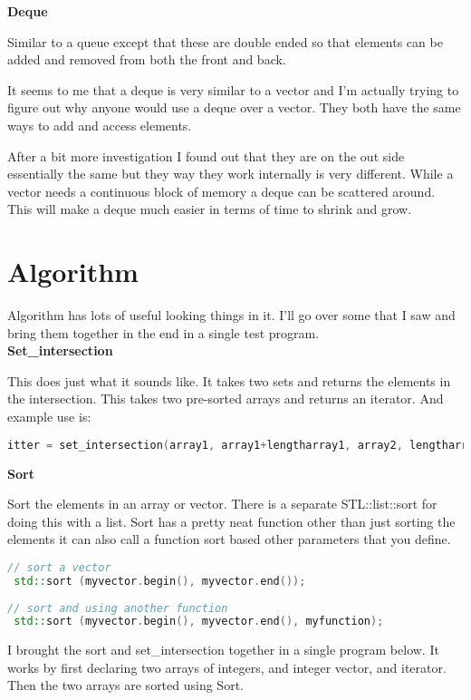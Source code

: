 \documentclass[a4paper,12pt]{article}
\begin{document}
\textbf{Deque}

Similar to a queue except that these are double ended so that elements can be added and removed from both the front and back. 

It seems to me that a deque is very similar to a vector and I'm actually trying to figure out why anyone would use a deque over a vector. They both have the same ways to add and access elements.  

After a bit more investigation I found out that they are on the out side essentially the same but they way they work internally is very different.  While a vector needs a continuous block of memory a deque can be scattered around.  This will make a deque much easier in terms of time to shrink and grow.  

\section{Algorithm}

Algorithm has lots of useful looking things in it.  I'll go over some that I saw and bring them together in the end in a single test program. \\

\textbf{Set\_intersection}

This does just what it sounds like.  It takes two sets and returns the elements in the intersection.  This takes two pre-sorted arrays and returns an iterator.  And example use is:

\begin{lstlisting}[language=cpp,caption={Using set\_intersection}]
	itter = set_intersection(array1, array1+lengtharray1, array2, lengtharray2);
\end{lstlisting}

\textbf{Sort}

Sort the elements in an array or vector.  There is a separate STL::list::sort for doing this with a list.  Sort has a pretty neat function other than just sorting the elements it can also call a function sort based other parameters that you define.   

\begin{lstlisting}[language=cpp,caption={Using sort}]
// sort a vector
 std::sort (myvector.begin(), myvector.end());  
 
// sort and using another function
 std::sort (myvector.begin(), myvector.end(), myfunction);
\end{lstlisting}

I brought the sort and set\_intersection together in a single program below.  It works by first declaring two arrays of integers, and integer vector, and iterator.  Then the two arrays are sorted using Sort.  
\end{document}
